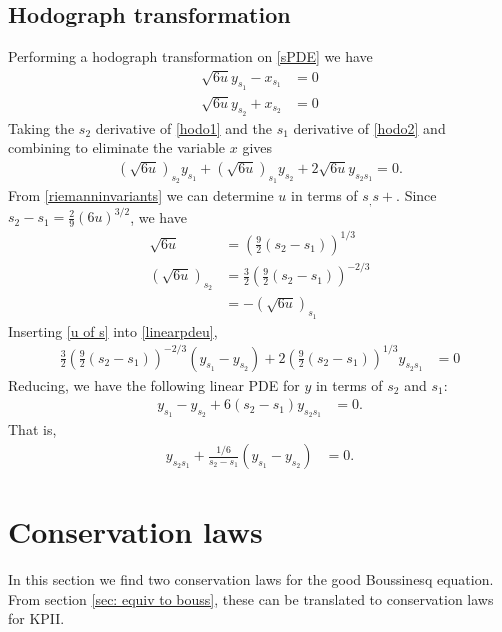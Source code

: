 \documentclass[12pt]{article}
\numberwithin{equation}{section}
\begin{document}
\subsection{Hodograph transformation}
Performing a hodograph transformation on \eqref{sPDE} we have
\begin{subequations}
    \begin{align}
        \sqrt{6u}y_{s_1}-x_{s_1} &= 0 \label{hodo1}\\
        \sqrt{6u}y_{s_2}+x_{s_2} &= 0 \label{hodo2}
    \end{align} \label{hodo}
\end{subequations}
Taking the $s_2$ derivative of \eqref{hodo1} and the $s_1$ derivative of \eqref{hodo2} and combining to eliminate the variable $x$ gives
\begin{align}
    \left(\sqrt{6u}\right)_{s_2}y_{s_1} +  \left(\sqrt{6u}\right)_{s_1}y_{s_2}+2\sqrt{6u}y_{s_2s_1} = 0. \label{linearpdeu}
\end{align}
From \eqref{riemanninvariants} we can determine $u$ in terms of $s_,s+$. Since $s_2-s_1 = \frac{2}{9}(6u)^{3/2}$, we have
\begin{subequations}
    \begin{align}
    \sqrt{6u} &= \left(\frac{9}{2}(s_2-s_1)\right)^{1/3} \\
    \left(\sqrt{6u}\right)_{s_2} &= \frac{3}{2}\left(\frac{
    9}{2}(s_2-s_1)\right)^{-2/3} \\
    &= -\left(\sqrt{6u}\right)_{s_1}
\end{align} \label{u of s}
\end{subequations}
Inserting \eqref{u of s} into \eqref{linearpdeu}, 
\begin{align}
    \frac{3}{2}\left(\frac{
    9}{2}(s_2-s_1)\right)^{-2/3} (y_{s_1} - y_{s_2}) + 2\left(\frac{9}{2}(s_2-s_1)\right)^{1/3}y_{s_2s_1} &=0
\end{align}
Reducing, we have the following linear PDE for $y$ in terms of $s_2$ and $s_1$:
\begin{align}
    y_{s_1}-y_{s_2} + 6(s_2-s_1)y_{s_2s_1} &= 0.
\end{align}
That is,
\begin{align}
   y_{s_2s_1} + \frac{1/6}{s_2-s_1}( y_{s_1}-y_{s_2}) &= 0.
\end{align}


\section{Conservation laws}
In this section we find two conservation laws for the good Boussinesq equation. From section \ref{sec: equiv to bouss}, these can be translated to conservation laws for KPII.
\end{document}
